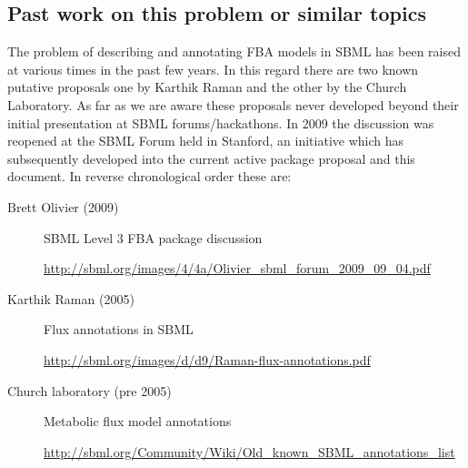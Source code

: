 \subsection{Past work on this problem or similar topics}
The problem of describing and annotating FBA models in SBML has been raised
at various times in the past few years. In this regard there are two known
putative proposals one by Karthik Raman and the other by the Church
Laboratory. As far as we are aware these proposals never developed beyond
their initial presentation at SBML forums/hackathons. In 2009 the discussion
was reopened at the SBML Forum held in Stanford, an initiative which has subsequently developed into the current active package proposal and this document. In reverse chronological order these are:
%
\begin{description}
  \item[Brett Olivier (2009)] SBML Level 3 FBA package discussion
  \item[]\url{http://sbml.org/images/4/4a/Olivier_sbml_forum_2009_09_04.pdf}
  \item[Karthik Raman (2005)] Flux annotations in SBML
  \item[]\url{http://sbml.org/images/d/d9/Raman-flux-annotations.pdf}
  \item[Church laboratory (pre 2005)] Metabolic flux model annotations
  \item[]\url{http://sbml.org/Community/Wiki/Old_known_SBML_annotations_list}
\end{description}


